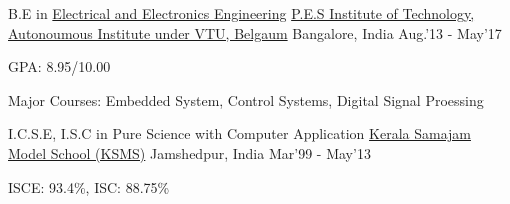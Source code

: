 \begin{cventries}
	\cventry
	{B.E in \href{https://eee.pes.edu/}{Electrical and Electronics Engineering}}
	{\href{https://pesit.pes.edu/}{P.E.S Institute of Technology, Autonoumous Institute under VTU, Belgaum}}
	{Bangalore, India}
	{Aug.'13 - May'17}
	{
		\begin{cvitems}
		\item{GPA: 8.95/10.00}
		\item{Major Courses: Embedded System, Control Systems, Digital Signal Proessing}
		\end{cvitems}
	}
\end{cventries}

\begin{cventries}
	\cventry
	{I.C.S.E, I.S.C in {Pure Science with Computer Application}}
	{\href{https://ksms.ac.in/}{Kerala Samajam Model School (KSMS)}}
	{Jamshedpur, India}
	{Mar'99 - May'13}
	{
		\begin{cvitems}
		\item{ISCE: 93.4\%, ISC: 88.75\%}
		\end{cvitems}
	}
\end{cventries}
